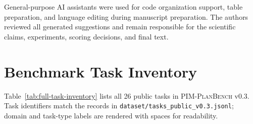 \documentclass[11pt]{article}
\newcommand{\pimplanbench}{\textsc{PIM-PlanBench}}
\begin{document}
General-purpose AI assistants were used for code organization support, table preparation, and language editing during manuscript preparation. The authors reviewed all generated suggestions and remain responsible for the scientific claims, experiments, scoring decisions, and final text.




\appendix

\section{Benchmark Task Inventory}
\label{app:task-inventory}

Table~\ref{tab:full-task-inventory} lists all 26 public tasks in \pimplanbench{} v0.3. Task identifiers match the records in \texttt{dataset/tasks\_public\_v0.3.jsonl}; domain and task-type labels are rendered with spaces for readability.
\end{document}
